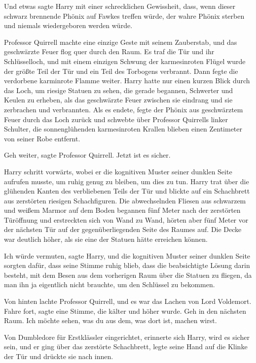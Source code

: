 Und etwas sagte Harry mit einer schrecklichen Gewissheit, dass, wenn dieser
schwarz brennende Phönix auf Fawkes treffen würde, der wahre Phönix sterben und
niemals wiedergeboren werden würde.

Professor Quirrell machte eine einzige Geste mit seinem Zauberstab, und das
geschwärzte Feuer flog quer durch den Raum. Es traf die Tür und ihr
Schlüsselloch, und mit einem einzigen Schwung der karmesinroten Flügel wurde der
größte Teil der Tür und ein Teil des Torbogens verbrannt. Dann fegte die
verdorbene karminrote Flamme weiter. Harry hatte nur einen kurzen Blick durch
das Loch, um riesige Statuen zu sehen, die gerade begannen, Schwerter und Keulen
zu erheben, als das geschwärzte Feuer zwischen sie eindrang und sie zerbrachen
und verbrannten. Als es endete, fegte der Phönix aus geschwärztem Feuer durch
das Loch zurück und schwebte über Professor Quirrells linker Schulter, die
sonnenglühenden karmesinroten Krallen blieben einen Zentimeter von seiner Robe
entfernt.

\glqq{}Geh weiter\grqq{}, sagte Professor Quirrell. \glqq{}Jetzt ist es sicher.\grqq{}

Harry schritt vorwärts, wobei er die kognitiven Muster seiner dunklen Seite
aufrufen musste, um ruhig genug zu bleiben, um dies zu tun. Harry trat über die
glühenden Kanten des verbliebenen Teils der Tür und blickte auf ein Schachbrett
aus zerstörten riesigen Schachfiguren. Die abwechselnden Fliesen aus schwarzem
und weißem Marmor auf dem Boden begannen fünf Meter nach der zerstörten
Türöffnung und erstreckten sich von Wand zu Wand, hörten aber fünf Meter vor der
nächsten Tür auf der gegenüberliegenden Seite des Raumes auf. Die Decke war
deutlich höher, als sie eine der Statuen hätte erreichen können.

\glqq{}Ich würde vermuten\grqq{}, sagte Harry, und die kognitiven Muster seiner
dunklen Seite sorgten dafür, dass seine Stimme ruhig blieb, \glqq{}dass die
beabsichtigte Lösung darin besteht, mit dem Besen aus dem vorherigen Raum über
die Statuen zu fliegen, da man ihn ja eigentlich nicht brauchte, um den
Schlüssel zu bekommen.\grqq{}

Von hinten lachte Professor Quirrell, und es war das Lachen von Lord Voldemort.
\glqq{}Fahre fort\grqq{}, sagte eine Stimme, die kälter und höher wurde. \glqq{}
Geh in den nächsten Raum. Ich möchte sehen, was du aus dem, was dort ist, machen
wirst.\grqq{}

Von Dumbledore für Erstklässler eingerichtet, erinnerte sich Harry, wird es
sicher sein, und er ging über das zerstörte Schachbrett, legte seine Hand auf
die Klinke der Tür und drückte sie nach innen.

